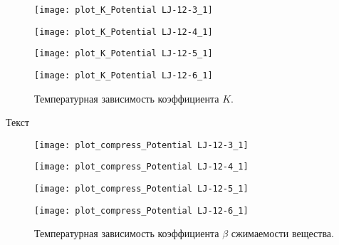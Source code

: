 \begin{figure}[htbp!]
\begin{center}
\begin{minipage}[h]{0.45\linewidth}
\texttt{[image: plot\_K\_Potential LJ-12-3\_1]}
\end{minipage}
\begin{minipage}[h]{0.45\linewidth}
\texttt{[image: plot\_K\_Potential LJ-12-4\_1]}
\end{minipage}


\begin{minipage}[h]{0.45\linewidth}
\texttt{[image: plot\_K\_Potential LJ-12-5\_1]}
\end{minipage}
\begin{minipage}[h]{0.45\linewidth}
\texttt{[image: plot\_K\_Potential LJ-12-6\_1]}
\end{minipage}
\caption{Температурная зависимость коэффициента $K$.}
\label{ris12}
\end{center}
\end{figure}

Текст


\begin{figure}[htbp!]
\begin{center}
\begin{minipage}[h]{0.45\linewidth}
\texttt{[image: plot\_compress\_Potential LJ-12-3\_1]}
\end{minipage}
\begin{minipage}[h]{0.45\linewidth}
\texttt{[image: plot\_compress\_Potential LJ-12-4\_1]}
\end{minipage}


\begin{minipage}[h]{0.45\linewidth}
\texttt{[image: plot\_compress\_Potential LJ-12-5\_1]}
\end{minipage}
\begin{minipage}[h]{0.45\linewidth}
\texttt{[image: plot\_compress\_Potential LJ-12-6\_1]}
\end{minipage}
\caption{Температурная зависимость коэффициента $\beta$ сжимаемости вещества.}
\label{ris13}
\end{center}
\end{figure}

